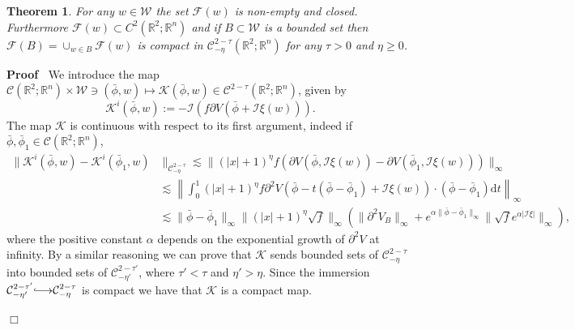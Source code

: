 \documentclass[a4paper,10pt]{article}
\newcommand{\assign}{:=}
\newcommand{\longhookrightarrow}{{\lhook\joinrel\relbar\joinrel\rightarrow}}
\newcommand{\mathd}{\mathrm{d}}
\newenvironment{proof}{\noindent\textbf{Proof\ }}{\hspace*{\fill}$\Box$\medskip}
\newtheorem{theorem}{Theorem}
\begin{document}
\begin{theorem}
  \label{theorem_existence1}For any $w \in \mathcal{W}$ the set $\mathcal{F}
  (w)$ is non-empty and closed. Furthermore $\mathcal{F} (w) \subset C^2
  (\mathbb{R}^2 ; \mathbb{R}^n)$ and if $B \subset \mathcal{W}$ is a bounded
  set then $\mathcal{F} (B) = \cup_{w \in B} \mathcal{F} (w)$ is compact in
  $\mathcal{C}_{- \eta}^{2 - \tau} (\mathbb{R}^2 ; \mathbb{R}^n)$ for any
  $\tau > 0$ and $\eta \geqslant 0$.
\end{theorem}

\begin{proof}
  We introduce the map $\mathcal{C} (\mathbb{R}^2 ; \mathbb{R}^n) \times
  \mathcal{W} \ni (\bar{\phi}, w) \mapsto \mathcal{K} (\bar{\phi}, w) \in
  \mathcal{C}^{2 - \tau} (\mathbb{R}^2 ; \mathbb{R}^n)$, given by
  \[ \mathcal{K}^i (\bar{\phi}, w) \assign -\mathcal{I} (f \partial V
     (\bar{\phi} +\mathcal{I} \xi (w))) . \]
  The map $\mathcal{K}$ is continuous with respect to its first argument,
  indeed if $\bar{\phi}, \bar{\phi}_1 \in \mathcal{C} (\mathbb{R}^2 ;
  \mathbb{R}^n)$,
  \begin{equation*}
  \begin{aligned}
    \| \mathcal{K}^i (\bar{\phi}, w) - \mathcal{K}^i (\bar{\phi}_1, w) &
    \|_{\mathcal{C}^{2 - \tau}_{- \eta}}  \lesssim  \| (| x | + 1)^{\eta} f
    (\partial V (\bar{\phi}, \mathcal{I} \xi (w)) - \partial V (\bar{\phi}_1,
    \mathcal{I} \xi (w))) \|_{\infty}\\
    & \lesssim  \left\| \int_0^1 (| x | + 1)^{\eta} f \partial^2 V
    (\bar{\phi} - t (\bar{\phi} - \bar{\phi}_1) +\mathcal{I} \xi (w)) \cdot
    (\bar{\phi} - \bar{\phi}_1) \mathd t \right\|_{\infty}\\
    & \lesssim  \| \bar{\phi} - \bar{\phi}_1 \|_{\infty} \| (| x | +
    1)^{\eta} \sqrt{f} \|_{\infty} \left( \| \partial^2 V_B \|_{\infty} +
    e^{\alpha \| \bar{\phi} - \bar{\phi}_1 \|_{\infty}} \| \sqrt{f} e^{\alpha
    | \mathcal{I} \xi |} \|_{\infty} \right),
  \end{aligned}
  \end{equation*}
  where the positive constant $\alpha$ depends on the exponential growth of
  $\partial^2 V$ at infinity. By a similar reasoning we can prove that
  $\mathcal{K}$ sends bounded sets of $\mathcal{C}^{2 - \tau}_{- \eta}$ into
  bounded sets of $\mathcal{C}^{2 - \tau'}_{- \eta'}$, where $\tau' < \tau$
  and $\eta' > \eta$. Since the immersion $\mathcal{C}^{2 - \tau'}_{- \eta'}
  \longhookrightarrow \mathcal{C}^{2 - \tau}_{- \eta}$ is compact we have that
  $\mathcal{K}$ is a compact map.
  

\end{proof}
\end{document}
